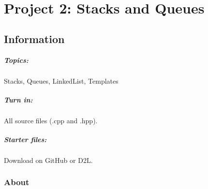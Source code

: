 \documentclass[a4paper,12pt,oneside]{book}
\title{}
\author{Rachel Morris}
\date{\today}
\newcommand{\laLab}{Project 2: Stacks and Queues\ }
\begin{document}
    \chapter*{\laLab} 

        \section{Information}
            \paragraph{ Topics: } Stacks, Queues, LinkedList, Templates
            \paragraph{ Turn in: } All source files (.cpp and .hpp).
            \paragraph{ Starter files: } Download on GitHub or D2L.

        \subsection{About}


\renewcommand*\DTstylecomment{\rmfamily\color{green}\textsc}
\end{document}
